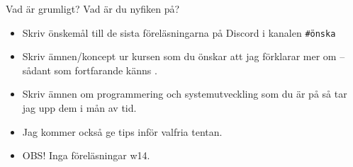 


\ifkompendium\else


\begin{SlideExtra}{Vad är grumligt? Vad är du nyfiken på?}\SlideFontSmall

\begin{itemize}
\item Skriv önskemål till de sista föreläsningarna på Discord i kanalen \texttt{\#önska} 
\item Skriv ämnen/koncept ur kursen som du önskar att jag förklarar mer om -- sådant som fortfarande känns . 
\item Skriv ämnen om programmering och systemutveckling som du är  på så tar jag upp dem i mån av tid. 
\item Jag kommer också ge tips inför valfria tentan.  
\item OBS! Inga föreläsningar w14.
\end{itemize}

\end{SlideExtra}


%
%

\fi
